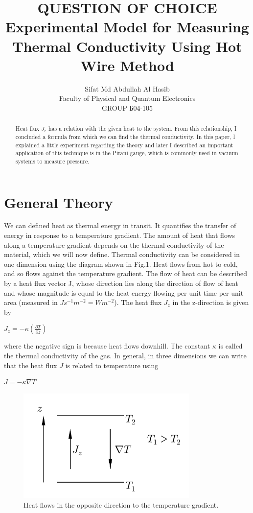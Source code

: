 \documentclass[a4paper, 12pt]{article}%
\author{Sifat Md Abdullah Al Hasib \\
Faculty of Physical and Quantum Electronics \\
GROUP Б04-105}
\title{\textbf{QUESTION OF CHOICE \\ 
Experimental Model for Measuring Thermal Conductivity Using Hot Wire Method}}
\begin{document}
\maketitle
\begin{abstract}
Heat flux $J_r$ has a relation with the given heat to the system. From this relationship, I concluded a formula from which we can find the thermal conductivity. In this paper, I explained a little experiment regarding the theory and later I described an important application of this technique is in the Pirani gauge, which is commonly used in vacuum
systems to measure pressure.
\end{abstract}
\section{General Theory}
We can defined heat as thermal energy in transit. It quantifies the
transfer of energy in response to a temperature gradient. The amount
of heat that flows along a temperature gradient depends on the thermal
conductivity of the material, which we will now define. Thermal conductivity can be considered in one dimension using the
diagram shown in Fig.1. Heat flows from hot to cold, and so flows
against the temperature gradient. The flow of heat can be described by
a heat flux vector J, whose direction lies along the direction of flow of heat and whose magnitude is equal to the heat energy flowing per unit
time per unit area (measured in $Js^{-1}m^{-2} = Wm^{-2}$). The heat flux $J_z$ in the z-direction is given by
\begin{center}
$J_z = -\kappa(\frac{\partial T}{\partial z})$
\end{center}

where the negative sign is because heat flows downhill. The constant
$\kappa$ is called the thermal conductivity of the gas. In general, in three dimensions we can write that the heat flux $J$ is related to temperature using
\begin{center}
$J = -\kappa \nabla T$
\end{center}

\begin{figure}[h]
\begin{center}
\includegraphics[width = 0.8\textwidth]{Bigar 1.png}
\caption{Heat flows in the opposite direction to the temperature gradient.}
\end{center}
\end{figure}
\newpage
\end{document}

